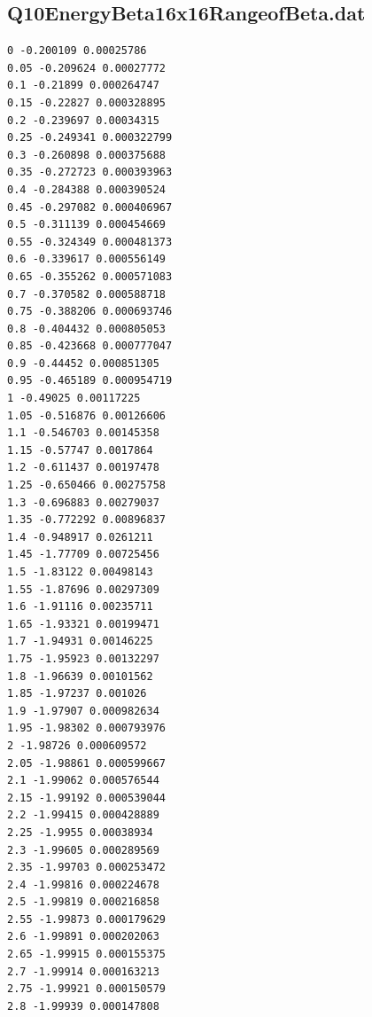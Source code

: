 \subsection{Q10EnergyBeta16x16RangeofBeta.dat}
\begin{lstlisting}
0 -0.200109 0.00025786
0.05 -0.209624 0.00027772
0.1 -0.21899 0.000264747
0.15 -0.22827 0.000328895
0.2 -0.239697 0.00034315
0.25 -0.249341 0.000322799
0.3 -0.260898 0.000375688
0.35 -0.272723 0.000393963
0.4 -0.284388 0.000390524
0.45 -0.297082 0.000406967
0.5 -0.311139 0.000454669
0.55 -0.324349 0.000481373
0.6 -0.339617 0.000556149
0.65 -0.355262 0.000571083
0.7 -0.370582 0.000588718
0.75 -0.388206 0.000693746
0.8 -0.404432 0.000805053
0.85 -0.423668 0.000777047
0.9 -0.44452 0.000851305
0.95 -0.465189 0.000954719
1 -0.49025 0.00117225
1.05 -0.516876 0.00126606
1.1 -0.546703 0.00145358
1.15 -0.57747 0.0017864
1.2 -0.611437 0.00197478
1.25 -0.650466 0.00275758
1.3 -0.696883 0.00279037
1.35 -0.772292 0.00896837
1.4 -0.948917 0.0261211
1.45 -1.77709 0.00725456
1.5 -1.83122 0.00498143
1.55 -1.87696 0.00297309
1.6 -1.91116 0.00235711
1.65 -1.93321 0.00199471
1.7 -1.94931 0.00146225
1.75 -1.95923 0.00132297
1.8 -1.96639 0.00101562
1.85 -1.97237 0.001026
1.9 -1.97907 0.000982634
1.95 -1.98302 0.000793976
2 -1.98726 0.000609572
2.05 -1.98861 0.000599667
2.1 -1.99062 0.000576544
2.15 -1.99192 0.000539044
2.2 -1.99415 0.000428889
2.25 -1.9955 0.00038934
2.3 -1.99605 0.000289569
2.35 -1.99703 0.000253472
2.4 -1.99816 0.000224678
2.5 -1.99819 0.000216858
2.55 -1.99873 0.000179629
2.6 -1.99891 0.000202063
2.65 -1.99915 0.000155375
2.7 -1.99914 0.000163213
2.75 -1.99921 0.000150579
2.8 -1.99939 0.000147808
\end{lstlisting}


